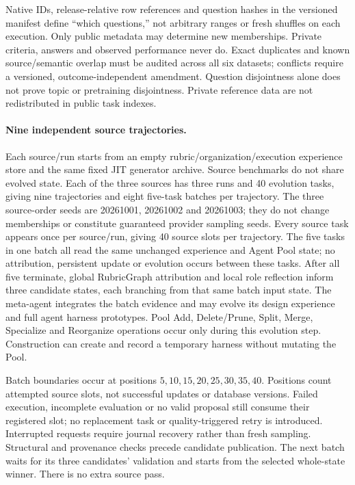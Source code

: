 Native IDs, release-relative row references and question hashes in the
versioned manifest define ``which questions,'' not arbitrary ranges or
fresh shuffles on each execution. Only public metadata may determine new
memberships. Private criteria, answers and observed performance never do.
Exact duplicates and known source/semantic overlap must be audited across
all six datasets; conflicts require a versioned, outcome-independent
amendment. Question disjointness alone does not prove topic or pretraining
disjointness. Private reference data are not redistributed in public task
indexes.

\paragraph{Nine independent source trajectories.}
Each source/run starts from an empty rubric/organization/execution experience
store and the same fixed JIT generator archive. Source benchmarks do not
share evolved state. Each of the three sources has three runs and 40
evolution tasks, giving nine trajectories and eight five-task batches per
trajectory.
The three source-order seeds are 20261001, 20261002 and 20261003; they do not
change memberships or constitute guaranteed provider sampling seeds.
Every source task appears once per source/run, giving 40 source slots per
trajectory. The five tasks in one batch all read the same unchanged
experience and Agent Pool state; no attribution, persistent update or
evolution occurs between these tasks. After all five terminate, global
RubricGraph attribution and local role reflection inform three candidate
states, each branching from that same batch input state. The meta-agent
integrates the batch evidence and may evolve its design experience and full
agent harness prototypes. Pool Add, Delete/Prune, Split, Merge, Specialize
and Reorganize operations occur only during this evolution step. Construction
can create and record a temporary harness without mutating the Pool.

Batch boundaries occur at positions $5,10,15,20,25,30,35,40$. Positions
count attempted source slots, not successful updates or database versions.
Failed execution, incomplete evaluation or no valid proposal still consume
their registered slot; no replacement task or quality-triggered retry is
introduced. Interrupted requests require journal recovery rather than
fresh sampling. Structural and provenance checks precede candidate
publication. The next batch waits for its three candidates' validation and
starts from the selected whole-state winner. There is no extra source pass.

